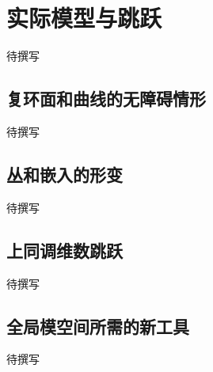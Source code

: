 
% 
% 
% 

\section{实际模型与跳跃}
\label{g4:sec:2904}

待撰写

\subsection{复环面和曲线的无障碍情形}
\label{g4:subsec:2904:01}
待撰写

\subsection{丛和嵌入的形变}
\label{g4:subsec:2904:02}
待撰写

\subsection{上同调维数跳跃}
\label{g4:subsec:2904:03}
待撰写

\subsection{全局模空间所需的新工具}
\label{g4:subsec:2904:04}
待撰写
